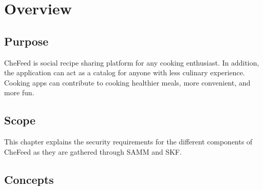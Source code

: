 \section{Overview}

\subsection{Purpose}
CheFeed is social recipe sharing platform for any cooking enthusiast. In addition, the application can act as a catalog for anyone with less culinary experience. Cooking apps can contribute to cooking healthier meals, more convenient, and more fun.

\subsection{Scope}
This chapter explains the security requirements for the different components of CheFeed as they are gathered through SAMM and SKF.

\subsection{Concepts}



